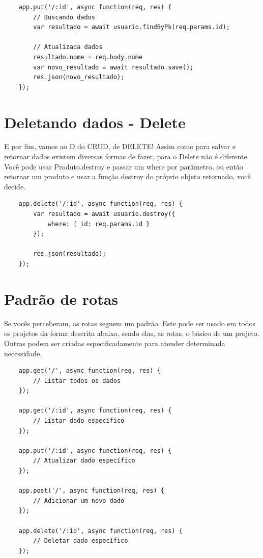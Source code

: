 \begin{verbatim}
	app.put('/:id', async function(req, res) {
		// Buscando dados
		var resultado = await usuario.findByPk(req.params.id);
		
		// Atualizada dados
		resultado.nome = req.body.nome
		var novo_resultado = await resultado.save();
		res.json(novo_resultado);
	});
\end{verbatim}

\section{Deletando dados - Delete}

E por fim, vamos ao D do CRUD, de DELETE! Assim como para salvar e retornar dados existem diversas formas de fazer, para o Delete não é diferente. Você pode usar Produto.destroy e passar um where por parâmetro, ou então retornar um produto e usar a função destroy do próprio objeto retornado, você decide.

\begin{verbatim}
	app.delete('/:id', async function(req, res) {
		var resultado = await usuario.destroy({ 
			where: { id: req.params.id }
		});
		
		res.json(resultado);
	});
\end{verbatim}

\section{Padrão de rotas}

Se vocês perceberam, as rotas seguem um padrão. Este pode ser usado em todos os projetos da forma descrita abaixo, sendo elas, as rotas, o básico de um projeto. Outras podem ser criadas especificadamente para atender determinada necessidade.

\begin{verbatim}
	app.get('/', async function(req, res) {
		// Listar todos os dados
	});
	
	app.get('/:id', async function(req, res) {
		// Listar dado específico
	});
	
	app.put('/:id', async function(req, res) {
		// Atualizar dado específico
	});
	
	app.post('/', async function(req, res) {
		// Adicionar um novo dado
	});
	
	app.delete('/:id', async function(req, res) {
		// Deletar dado específico
	});
\end{verbatim}

